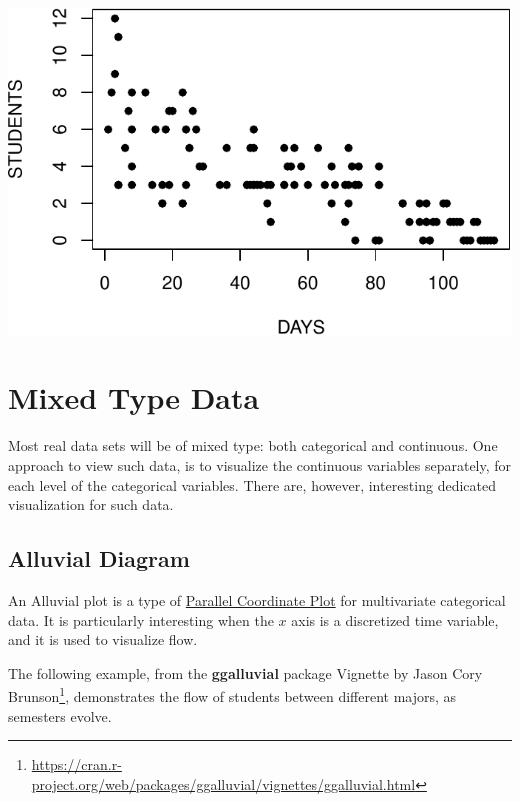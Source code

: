 \documentclass[]{book}
\renewcommand{\href}[2]{#2\footnote{\url{#1}}}
\theoremstyle{definition}
\theoremstyle{definition}
\theoremstyle{definition}
\theoremstyle{remark}
\begin{document}
\includegraphics[width=0.5\linewidth]{Rcourse_files/figure-latex/unnamed-chunk-143-1}

\hypertarget{mixed-type-data}{%
\section{Mixed Type Data}\label{mixed-type-data}}

Most real data sets will be of mixed type: both categorical and continuous.
One approach to view such data, is to visualize the continuous variables separately, for each level of the categorical variables.
There are, however, interesting dedicated visualization for such data.

\hypertarget{alluvial}{%
\subsection{Alluvial Diagram}\label{alluvial}}

An Alluvial plot is a type of \protect\hyperlink{parcoord}{Parallel Coordinate Plot} for multivariate categorical data.
It is particularly interesting when the \(x\) axis is a discretized time variable, and it is used to visualize flow.

The following example, from the \textbf{ggalluvial} package Vignette by \href{https://cran.r-project.org/web/packages/ggalluvial/vignettes/ggalluvial.html}{Jason Cory Brunson}, demonstrates the flow of students between different majors, as semesters evolve.
\end{document}
